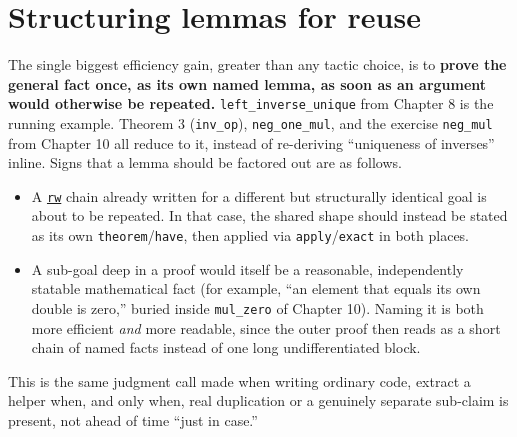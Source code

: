 \section{Structuring lemmas for reuse}\label{sec:13-working-efficiently:05-structuring-lemmas:1}

The single biggest efficiency gain, greater than any tactic choice, is to \textbf{prove the general fact once, as its own named lemma, as soon as an argument would otherwise be repeated.} \texttt{left\_\allowbreak{}inverse\_\allowbreak{}unique} from Chapter 8 is the running example. Theorem 3 (\texttt{inv\_\allowbreak{}op}), \texttt{neg\_\allowbreak{}one\_\allowbreak{}mul}, and the exercise \texttt{neg\_\allowbreak{}mul} from Chapter 10 all reduce to it, instead of re-deriving ``uniqueness of inverses'' inline. Signs that a lemma should be factored out are as follows.

\begin{itemize}
\tightlist
\item
  A \href{https://lean-lang.org/doc/reference/latest/Tactic-Proofs/Tactic-Reference/}{\texttt{rw}} chain already written for a different but structurally identical goal is about to be repeated. In that case, the shared shape should instead be stated as its own \texttt{theorem}/\texttt{have}, then applied via \texttt{apply}/\texttt{exact} in both places.
\item
  A sub-goal deep in a proof would itself be a reasonable, independently statable mathematical fact (for example, ``an element that equals its own double is zero,'' buried inside \texttt{mul\_\allowbreak{}zero} of Chapter 10). Naming it is both more efficient \emph{and} more readable, since the outer proof then reads as a short chain of named facts instead of one long undifferentiated block.
\end{itemize}

This is the same judgment call made when writing ordinary code, extract a helper when, and only when, real duplication or a genuinely separate sub-claim is present, not ahead of time ``just in case.''

